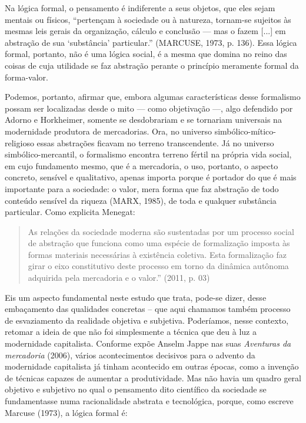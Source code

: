 Na lógica formal, o pensamento é indiferente a seus objetos, que eles
sejam mentais ou físicos, ``pertençam à sociedade ou à natureza,
tornam-se sujeitos às mesmas leis gerais da organização, cálculo e
conclusão --- mas o fazem {[}...{]} em abstração de sua `substância'
particular.'' (MARCUSE, 1973, p. 136). Essa lógica formal, portanto, não
é uma lógica social, é a mesma que domina no reino das coisas de cuja
utilidade se faz abstração perante o princípio meramente formal da
forma-valor.

Podemos, portanto, afirmar que, embora algumas características desse
formalismo possam ser localizadas desde o mito --- como objetivação ---,
algo defendido por Adorno e Horkheimer, somente se desdobrariam e se
tornariam universais na modernidade produtora de mercadorias. Ora, no
universo simbólico-mítico-religioso essas abstrações ficavam no terreno
transcendente. Já no universo simbólico-mercantil, o formalismo encontra
terreno fértil na própria vida social, em cujo fundamento mesmo, que é a
mercadoria, o uso, portanto, o aspecto concreto, sensível e qualitativo,
apenas importa porque é portador do que é mais importante para a
sociedade: o valor, mera forma que faz abstração de todo conteúdo
sensível da riqueza (MARX, 1985), de toda e qualquer substância
particular. Como explicita Menegat:

\begin{quote}
As relações da sociedade moderna são sustentadas por um processo social
de abstração que funciona como uma espécie de formalização imposta às
formas materiais necessárias à existência coletiva. Esta formalização
faz girar o eixo constitutivo deste processo em torno da dinâmica
autônoma adquirida pela mercadoria e o valor.'' (2011, p. 03)
\end{quote}

Eis um aspecto fundamental neste estudo que trata, pode-se dizer, desse
embaçamento das qualidades concretas -- que aqui chamamos também
processo de esvaziamento da realidade objetiva e subjetiva. Poderíamos,
nesse contexto, retomar a ideia de que não foi simplesmente a técnica
que deu à luz a modernidade capitalista. Conforme expõe Anselm Jappe nas
suas \emph{Aventuras da mercadoria} (2006), vários acontecimentos
decisivos para o advento da modernidade capitalista já tinham acontecido
em outras épocas, como a invenção de técnicas capazes de aumentar a
produtividade. Mas não havia um quadro geral objetivo e subjetivo no
qual o pensamento dito científico da sociedade se fundamentasse numa
racionalidade abstrata e tecnológica, porque, como escreve Marcuse
(1973), a lógica formal é:

